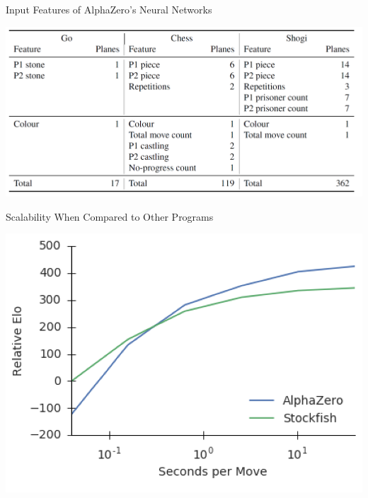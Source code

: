 \documentclass{beamer}
\begin{document}
  {

    \begin{frame}{Input Features of AlphaZero's Neural Networks}
      \begin{center}
        \includegraphics[width=\textwidth]{../img/AlphaZero-paper/input-features.png}
      \end{center}
    \end{frame}

    \begin{frame}{Scalability When Compared to Other Programs}
      \begin{center}
        \pause
        \includegraphics[height=.45\textheight]{../img/AlphaZero-paper/scalability-against-stockfish.png}


\end{center}
\end{frame}}
\end{document}
